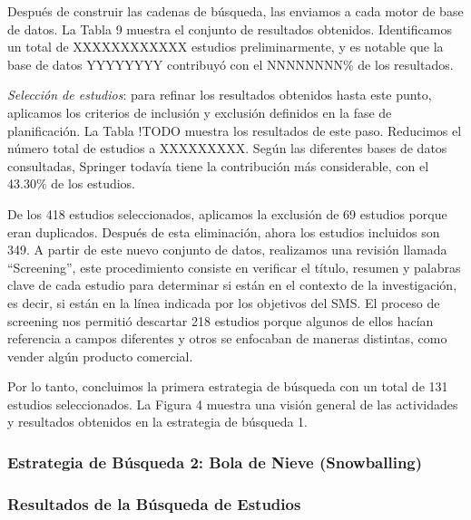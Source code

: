 Después de construir las cadenas de búsqueda, las enviamos a cada motor de base de datos. La Tabla 9 muestra el conjunto de resultados obtenidos. Identificamos un total de XXXXXXXXXXXX estudios preliminarmente, y es notable que la base de datos  YYYYYYYY contribuyó con el NNNNNNNN\% de los resultados.




\textit{Selección de estudios}: para refinar los resultados obtenidos hasta este punto, aplicamos los criterios de inclusión y exclusión definidos en la fase de planificación. La Tabla !TODO muestra los resultados de este paso. Reducimos el número total de estudios a XXXXXXXXX. Según las diferentes bases de datos consultadas, Springer todavía tiene la contribución más considerable, con el 43.30\% de los estudios.

De los 418 estudios seleccionados, aplicamos la exclusión de 69 estudios porque eran duplicados. Después de esta eliminación, ahora los estudios incluidos son 349. A partir de este nuevo conjunto de datos, realizamos una revisión llamada ``Screening'', este procedimiento consiste en verificar el título, resumen y palabras clave de cada estudio para determinar si están en el contexto de la investigación, es decir, si están en la línea indicada por los objetivos del SMS. El proceso de screening nos permitió descartar 218 estudios porque algunos de ellos hacían referencia a campos diferentes y otros se enfocaban de maneras distintas, como vender algún producto comercial.

Por lo tanto, concluimos la primera estrategia de búsqueda con un total de 131 estudios seleccionados. La Figura 4 muestra una visión general de las actividades y resultados obtenidos en la estrategia de búsqueda 1.

\subsubsection{Estrategia de Búsqueda 2: Bola de Nieve (Snowballing)}


\subsubsection{Resultados de la Búsqueda de Estudios}\label{subsubsec:resultados-busqueda}
